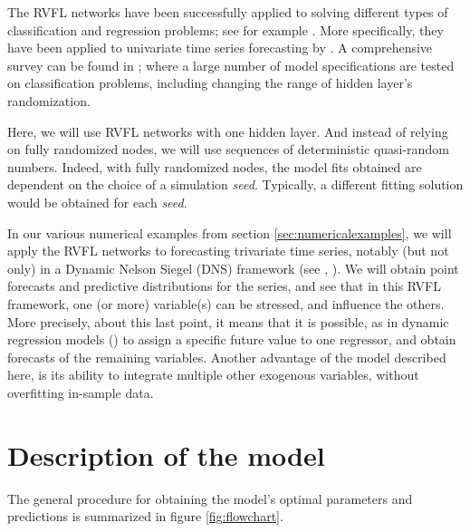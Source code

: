 \medskip

The RVFL networks have been successfully applied to solving different types of classification and regression problems; see for example \cite{dehuri2010comprehensive}. More specifically, they have been applied to univariate time series forecasting by \cite{ren2016random}. A comprehensive survey can be found in \cite{zhang2016comprehensive}; where a large number of model specifications are tested on classification problems, including changing the range of hidden layer's randomization.

\medskip

Here, we will use RVFL networks with one hidden layer. And instead of relying on fully randomized nodes, we will use sequences of deterministic quasi-random numbers. Indeed, with fully randomized nodes, the model fits obtained are dependent on the choice of a simulation \textit{seed}. Typically, a different fitting solution would be obtained for each \textit{seed}.

\medskip

In our various numerical examples from section \ref{sec:numericalexamples}, we will apply the RVFL networks to forecasting trivariate time series, notably (but not only) in a Dynamic Nelson Siegel (DNS) framework (see \cite{nelson1987parsimonious}, \cite{diebold2006forecasting}). We will obtain point forecasts and predictive distributions  for the series, and see that in this RVFL framework, one (or more) variable(s) can be stressed, and influence the others. More precisely, about this last point, it means that it is possible, as in dynamic regression models (\cite{pankratz2012forecasting}) to assign a specific future value to one regressor, and obtain forecasts of the remaining variables. Another advantage of the model described here, is its ability to integrate multiple other exogenous variables, without overfitting in-sample data.

\section{Description of the model}

The general procedure for obtaining the model's optimal parameters and predictions is  summarized in figure \ref{fig:flowchart}.

